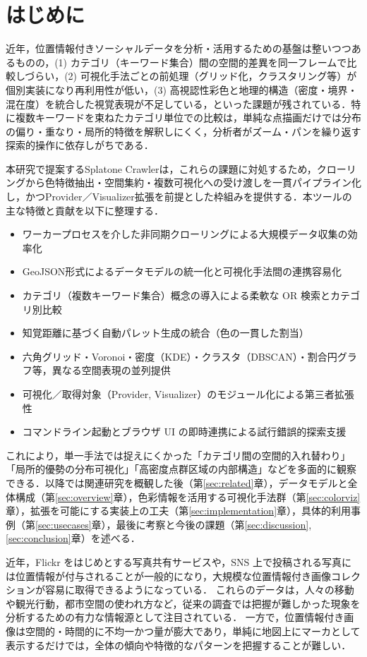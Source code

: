 \section{はじめに}
近年，位置情報付きソーシャルデータを分析・活用するための基盤は整いつつあるものの，(1) カテゴリ（キーワード集合）間の空間的差異を同一フレームで比較しづらい，(2) 可視化手法ごとの前処理（グリッド化，クラスタリング等）が個別実装になり再利用性が低い，(3) 高視認性彩色と地理的構造（密度・境界・混在度）を統合した視覚表現が不足している，といった課題が残されている．特に複数キーワードを束ねたカテゴリ単位での比較は，単純な点描画だけでは分布の偏り・重なり・局所的特徴を解釈しにくく，分析者がズーム・パンを繰り返す探索的操作に依存しがちである．


本研究で提案するSplatone Crawlerは，これらの課題に対処するため，クローリングから色特徴抽出・空間集約・複数可視化への受け渡しを一貫パイプライン化し，かつProvider／Visualizer拡張を前提とした枠組みを提供する．本ツールの主な特徴と貢献を以下に整理する．
\begin{itemize}
  \item ワーカープロセスを介した非同期クローリングによる大規模データ収集の効率化
  \item GeoJSON形式によるデータモデルの統一化と可視化手法間の連携容易化
  \item カテゴリ（複数キーワード集合）概念の導入による柔軟な OR 検索とカテゴリ別比較
  \item 知覚距離に基づく自動パレット生成の統合（色の一貫した割当）
  \item 六角グリッド・Voronoi・密度（KDE）・クラスタ（DBSCAN）・割合円グラフ等，異なる空間表現の並列提供
  \item 可視化／取得対象（Provider, Visualizer）のモジュール化による第三者拡張性
  \item コマンドライン起動とブラウザ UI の即時連携による試行錯誤的探索支援
\end{itemize}

これにより，単一手法では捉えにくかった「カテゴリ間の空間的入れ替わり」「局所的優勢の分布可視化」「高密度点群区域の内部構造」などを多面的に観察できる．以降では関連研究を概観した後（第\ref{sec:related}章），データモデルと全体構成（第\ref{sec:overview}章），色彩情報を活用する可視化手法群（第\ref{sec:colorviz}章），拡張を可能にする実装上の工夫（第\ref{sec:implementation}章），具体的利用事例（第\ref{sec:usecases}章），最後に考察と今後の課題（第\ref{sec:discussion},\ref{sec:conclusion}章）を述べる．

近年，Flickr をはじめとする写真共有サービスや，SNS 上で投稿される写真には位置情報が付与されることが一般的になり，大規模な位置情報付き画像コレクションが容易に取得できるようになっている．
これらのデータは，人々の移動や観光行動，都市空間の使われ方など，従来の調査では把握が難しかった現象を分析するための有力な情報源として注目されている．
一方で，位置情報付き画像は空間的・時間的に不均一かつ量が膨大であり，単純に地図上にマーカとして表示するだけでは，全体の傾向や特徴的なパターンを把握することが難しい．

